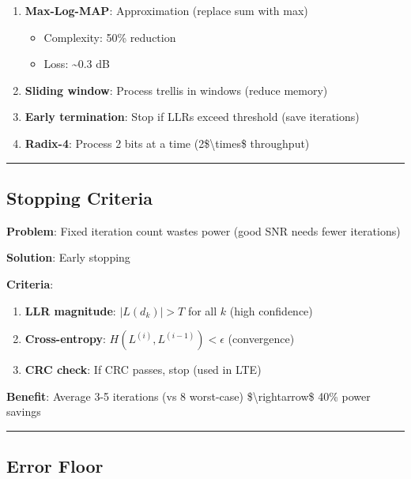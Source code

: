 \begin{enumerate}
\def\labelenumi{\arabic{enumi}.}
\item
  \textbf{Max-Log-MAP}: Approximation (replace sum with max)

  \begin{itemize}
  \tightlist
  \item
    Complexity: 50\% reduction
  \item
    Loss: \textasciitilde0.3 dB
  \end{itemize}
\item
  \textbf{Sliding window}: Process trellis in windows (reduce memory)
\item
  \textbf{Early termination}: Stop if LLRs exceed threshold (save
  iterations)
\item
  \textbf{Radix-4}: Process 2 bits at a time (2\$\textbackslash times\$
  throughput)
\end{enumerate}

\begin{center}\rule{0.5\linewidth}{0.5pt}\end{center}

\subsection{Stopping Criteria}\label{stopping-criteria}

\textbf{Problem}: Fixed iteration count wastes power (good SNR needs
fewer iterations)

\textbf{Solution}: Early stopping

\textbf{Criteria}:

\begin{enumerate}
\def\labelenumi{\arabic{enumi}.}
\item
  \textbf{LLR magnitude}: \(|L(d_k)| > T\) for all \(k\) (high
  confidence)
\item
  \textbf{Cross-entropy}: \(H(L^{(i)}, L^{(i-1)}) < \epsilon\)
  (convergence)
\item
  \textbf{CRC check}: If CRC passes, stop (used in LTE)
\end{enumerate}

\textbf{Benefit}: Average 3-5 iterations (vs 8 worst-case)
\$\textbackslash rightarrow\$ 40\% power savings

\begin{center}\rule{0.5\linewidth}{0.5pt}\end{center}

\subsection{Error Floor}\label{error-floor}

